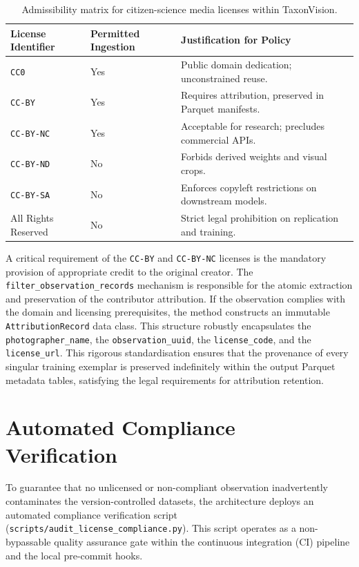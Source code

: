 \begin{table}[htbp]
\centering
\begin{tabularx}{\textwidth}{@{}llX@{}}
\toprule
\textbf{License Identifier} & \textbf{Permitted Ingestion} & \textbf{Justification for Policy} \\
\midrule
\texttt{CC0} & Yes & Public domain dedication; unconstrained reuse. \\
\texttt{CC-BY} & Yes & Requires attribution, preserved in Parquet manifests. \\
\texttt{CC-BY-NC} & Yes & Acceptable for research; precludes commercial APIs. \\
\texttt{CC-BY-ND} & No & Forbids derived weights and visual crops. \\
\texttt{CC-BY-SA} & No & Enforces copyleft restrictions on downstream models. \\
All Rights Reserved & No & Strict legal prohibition on replication and training. \\
\bottomrule
\end{tabularx}
\caption{Admissibility matrix for citizen-science media licenses within TaxonVision.}
\label{tab:license_admissibility}
\end{table}

A critical requirement of the \texttt{CC-BY} and \texttt{CC-BY-NC} licenses is the mandatory provision of appropriate credit to the original creator. The \texttt{filter\_observation\_records} mechanism is responsible for the atomic extraction and preservation of the contributor attribution. If the observation complies with the domain and licensing prerequisites, the method constructs an immutable \texttt{AttributionRecord} data class. This structure robustly encapsulates the \texttt{photographer\_name}, the \texttt{observation\_uuid}, the \texttt{license\_code}, and the \texttt{license\_url}. This rigorous standardisation ensures that the provenance of every singular training exemplar is preserved indefinitely within the output Parquet metadata tables, satisfying the legal requirements for attribution retention.

\section{Automated Compliance Verification}
\label{sec:compliance_verification}

To guarantee that no unlicensed or non-compliant observation inadvertently contaminates the version-controlled datasets, the architecture deploys an automated compliance verification script (\texttt{scripts/audit\_license\_compliance.py}). This script operates as a non-bypassable quality assurance gate within the continuous integration (CI) pipeline and the local pre-commit hooks.

